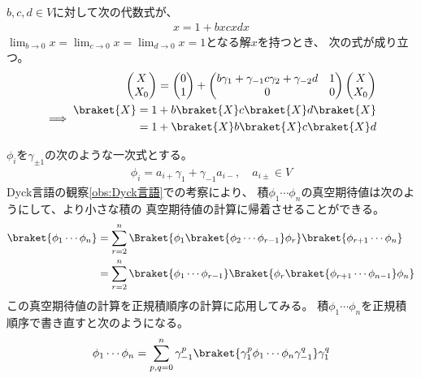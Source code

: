 {	\begin{todo}[３次元Dyck言語]\label{todo:３次元Dyck言語} %
		$b,c,d\in V$に対して次の代数式が、
		\begin{equation*}\begin{split}
			x = 1 + bxcxdx
		\end{split}\end{equation*}
		$\lim_{b\to0}x=\lim_{c\to0}x=\lim_{d\to0}x=1$となる解$x$を持つとき、
		次の式が成り立つ。
		\begin{equation*}\begin{split}
			\pvec{X}{X_0} = \pvec{0}{1} + \begin{pmatrix}
				b\gamma_1 + \gamma_{-1}c\gamma_2 + \gamma_{-2}d & 1 \\ 0 & 0
			\end{pmatrix}\pvec{X}{X_0} \\
			\implies \begin{split}
				\braket{X} &= 1 + b\braket{X}c\braket{X}d\braket{X} \\
				&= 1 + \braket{X}b\braket{X}c\braket{X}d \\
			\end{split}
		\end{split}\end{equation*}
	\end{todo} %

	\begin{todo}[正規積順序の計算]\label{todo:正規積順序の計算} %
		$\phi_i$を$\gamma_{\pm1}$の次のような一次式とする。
		\begin{equation*}\begin{split}
			\phi_i = a_{i+}\gamma_1 + \gamma_{-1}a_{i-},\quad a_{i\pm}\in V
		\end{split}\end{equation*}
		Dyck言語の観察\ref{obs:Dyck言語}での考察により、
		積$\phi_1\cdots\phi_n$の真空期待値は次のようにして、より小さな積の
		真空期待値の計算に帰着させることができる。
		\begin{equation*}\begin{split}
			\braket{\phi_1\cdots\phi_n} &= \sum_{r=2}^n
			\Braket{\phi_1\braket{\phi_2\cdots\phi_{r-1}}\phi_r}
			\braket{\phi_{r+1}\cdots\phi_n} \\
			&= \sum_{r=2}^n \braket{\phi_1\cdots\phi_{r-1}}
			\Braket{\phi_r\braket{\phi_{r+1}\cdots\phi_{n-1}}\phi_n} \\
		\end{split}\end{equation*}
		この真空期待値の計算を正規積順序の計算に応用してみる。
		積$\phi_1\cdots\phi_n$を正規積順序で書き直すと次のようになる。
		\begin{equation*}\begin{split}
			\phi_1\cdots\phi_n = \sum_{p,q=0}^n\gamma_{-1}^p
				\braket{\gamma_1^p\phi_1\cdots\phi_n\gamma_{-1}^q}\gamma_1^q
		\end{split}\end{equation*}


\end{todo}}

